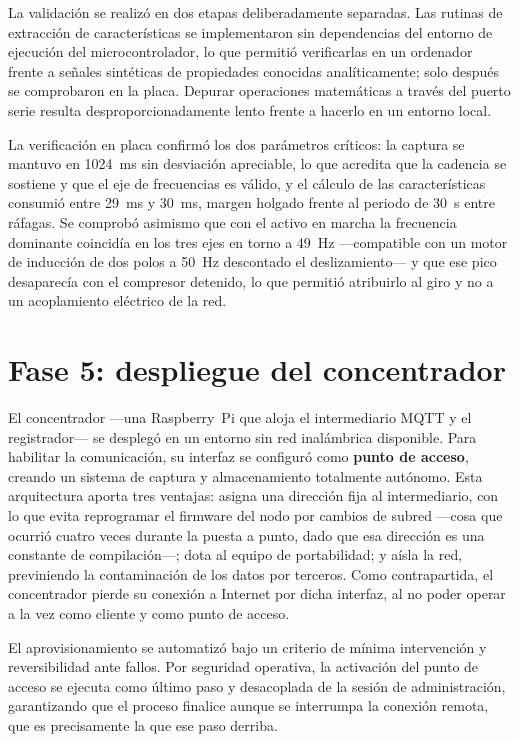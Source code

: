 La validación se realizó en dos etapas deliberadamente separadas. Las rutinas de extracción de
características se implementaron sin dependencias del entorno de ejecución del microcontrolador,
lo que permitió verificarlas en un ordenador frente a señales sintéticas de propiedades conocidas
analíticamente; solo después se comprobaron en la placa. Depurar operaciones matemáticas a través
del puerto serie resulta desproporcionadamente lento frente a hacerlo en un entorno local.

La verificación en placa confirmó los dos parámetros críticos: la captura se mantuvo en
\mbox{1024 ms} sin desviación apreciable, lo que acredita que la cadencia se sostiene y que el eje
de frecuencias es válido, y el cálculo de las características consumió entre \mbox{29 ms} y
\mbox{30 ms}, margen holgado frente al periodo de \mbox{30 s} entre ráfagas. Se comprobó asimismo
que con el activo en marcha la frecuencia dominante coincidía en los tres ejes en torno a
\mbox{49 Hz} —compatible con un motor de inducción de dos polos a \mbox{50 Hz} descontado el
deslizamiento— y que ese pico desaparecía con el compresor detenido, lo que permitió atribuirlo al
giro y no a un acoplamiento eléctrico de la red.

\section{Fase 5: despliegue del concentrador}

El concentrador —una Raspberry~Pi que aloja el intermediario MQTT y el registrador— se desplegó en
un entorno sin red inalámbrica disponible. Para habilitar la comunicación, su interfaz se configuró
como \textbf{punto de acceso}, creando un sistema de captura y almacenamiento totalmente autónomo.
Esta arquitectura aporta tres ventajas: asigna una dirección fija al intermediario, con lo que
evita reprogramar el firmware del nodo por cambios de subred —cosa que ocurrió cuatro veces durante
la puesta a punto, dado que esa dirección es una constante de compilación—; dota al equipo de
portabilidad; y aísla la red, previniendo la contaminación de los datos por terceros. Como
contrapartida, el concentrador pierde su conexión a Internet por dicha interfaz, al no poder operar
a la vez como cliente y como punto de acceso.

El aprovisionamiento se automatizó bajo un criterio de mínima intervención y reversibilidad ante
fallos. Por seguridad operativa, la activación del punto de acceso se ejecuta como último paso y
desacoplada de la sesión de administración, garantizando que el proceso finalice aunque se
interrumpa la conexión remota, que es precisamente la que ese paso derriba.

